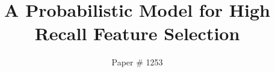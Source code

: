 \documentclass[letterpaper]{article}
\begin{document}
%
\title{A Probabilistic Model for High Recall Feature Selection}

\author{Paper \# 1253}


\maketitle
\begin{abstract}
\begin{quote}

\end{quote}
\end{abstract}












\end{document}
